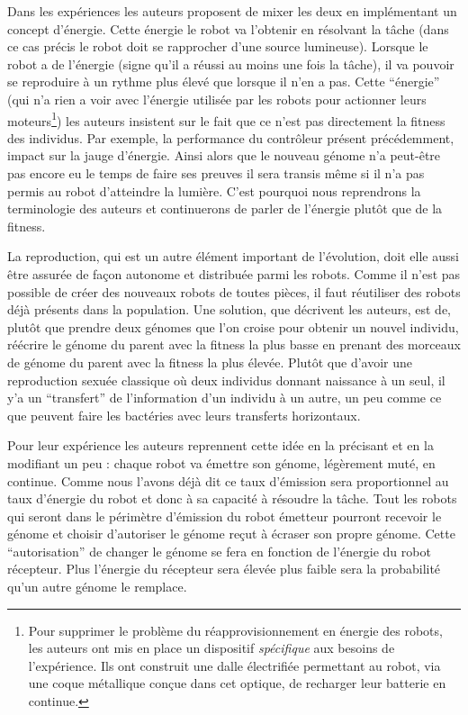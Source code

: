 Dans les expériences les auteurs proposent de mixer les deux en implémentant un concept d'énergie. Cette énergie le robot va l'obtenir en résolvant la tâche (dans ce cas précis le robot doit se rapprocher d'une source lumineuse). Lorsque le robot a de l'énergie (signe qu'il a réussi au moins une fois la tâche), il va pouvoir se reproduire à un rythme plus élevé que lorsque il n'en a pas. Cette ``énergie'' (qui n'a rien a voir avec l'énergie utilisée par les robots pour actionner leurs moteurs\footnote{Pour supprimer le problème du réapprovisionnement en énergie des robots, les auteurs ont mis en place un dispositif \emph{spécifique} aux besoins de l'expérience. Ils ont construit une dalle électrifiée permettant au robot, via une coque métallique conçue dans cet optique, de recharger leur batterie en continue.}) les auteurs insistent sur le fait que ce n'est pas directement la fitness des individus. Par exemple, la performance du contrôleur présent précédemment, impact sur la jauge d'énergie. Ainsi alors que le nouveau génome n'a peut-être pas encore eu le temps de faire ses preuves il sera transis même si il n'a pas permis au robot d'atteindre la lumière. C'est pourquoi nous reprendrons la terminologie des auteurs et continuerons de parler de l'énergie plutôt que de la fitness.

La reproduction, qui est un autre élément important de l'évolution, doit elle aussi être assurée de façon autonome et distribuée parmi les robots. Comme il n'est pas possible de créer des nouveaux robots de toutes pièces, il faut réutiliser des robots déjà présents dans la population. Une solution, que décrivent les auteurs, est de, plutôt que prendre deux génomes que l'on croise pour obtenir un nouvel individu, réécrire le génome du parent avec la fitness la plus basse en prenant des morceaux de génome du parent avec la fitness la plus élevée. Plutôt que d'avoir une reproduction sexuée classique où deux individus donnant naissance à un seul, il y'a un ``transfert'' de l'information d'un individu à un autre, un peu comme ce que peuvent faire les bactéries avec leurs transferts horizontaux.

Pour leur expérience les auteurs reprennent cette idée en la précisant et en la modifiant un peu : chaque robot va émettre son génome, légèrement muté, en continue. Comme nous l'avons déjà dit ce taux d'émission sera proportionnel au taux d'énergie du robot et donc à sa capacité à résoudre la tâche. Tout les robots qui seront dans le périmètre d'émission du robot émetteur pourront recevoir le génome et choisir d'autoriser le génome reçut à écraser son propre génome. Cette ``autorisation'' de changer le génome se fera en fonction de l'énergie du robot récepteur. Plus l'énergie du récepteur sera élevée plus faible sera la probabilité qu'un autre génome le remplace.

